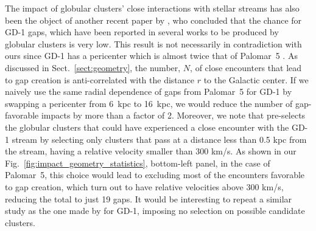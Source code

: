 \documentclass{aa}
\begin{document}
  The impact of globular clusters' close interactions with stellar streams has also been the object of another recent paper by \citet{2022ApJ...941..129D}, who concluded that the chance for GD-1 gaps, which have been reported in several works \citep[see, for example, ][]{2019ApJ...880...38B,2018MNRAS.477.1893D,2020AAS...23533607D} to be produced by globular clusters is very low. This result is not necessarily in contradiction with ours since GD-1 has a pericenter which is almost twice that of Palomar~5 \citep[see, for example][]{2019MNRAS.486.2995M}. As discussed in Sect.~\ref{sect:geometry}, the number, $N$, of close encounters that lead to gap creation is anti-correlated with the distance $r$ to the Galactic center. If we naively use the same radial dependence of gaps from Palomar~5 for GD-1 by swapping a pericenter from 6~kpc to 16~kpc, we would reduce the number of gap-favorable impacts by more than a factor of 2. Moreover, we note that \citet{2022ApJ...941..129D} pre-selects the globular clusters that could have experienced a close encounter with the GD-1 stream by selecting only clusters that pass at a distance less than 0.5 kpc from the stream, having a relative velocity smaller than  300 km/s. As shown in our Fig.~\ref{fig:impact_geometry_statistics}, bottom-left panel, in the case of Palomar~5, this choice would lead to excluding most of the encounters favorable to gap creation, which turn out to have relative velocities above 300 km/s, reducing the total to just 19 gaps. It would be interesting to repeat a similar study as the one made by \citet{2022ApJ...941..129D} for GD-1, imposing no selection on possible candidate clusters.\\
  
\end{document}
